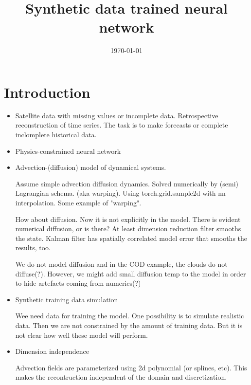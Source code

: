 \documentclass[a4paper,12pt]{article}
\title{Synthetic data trained neural network}
\author{}
\date{\today}
\begin{document}
\maketitle

\begin{abstract}
\end{abstract}

\section{Introduction}

\begin{itemize}
\item     
    Satellite data with missing values or incomplete data. Retrospective reconstruction of time series. The task is to make forecasts or complete inclomplete historical data.

    \item
        Physics-constrained neural network
    \item
        Advection-(diffusion) model of dynamical systems.

        Assume simple advection diffusion dynamics. Solved numerically by (semi) Lagrangian schema. (aka warping). Using torch.grid.sample2d with nn interpolation. Some example of "warping".

        How about diffusion. Now it is not explicitly in the model. There is evident numerical diffusion, or is there? At least dimension reduction filter smooths the state. Kalman filter has spatially correlated model error that smooths the results, too.

        We do not model diffusion and in the COD example, the clouds do not diffuse(?). However, we might add small diffusion temp to the model in order to hide artefacts coming from numerics(?)

    \item
        Synthetic training data simulation

        Wee need data for training the model. One possibility is to simulate realistic data. Then we are not constrained by the amount of training data. But it is not clear  how well these model will perform.

    \item
        Dimension independence

        Advection fields are parameterized using 2d polynomial (or splines, etc). This makes the recontruction independent of the domain and discretization.


\end{itemize}
\end{document}
